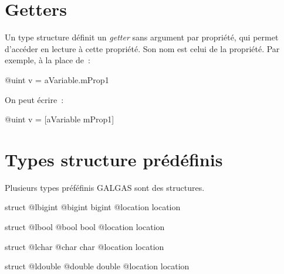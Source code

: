 \section{Getters}

Un type structure définit un \emph{getter} sans argument par propriété, qui permet d'accéder en lecture à cette propriété. Son nom est celui de la propriété. Par exemple, à la place de~:
\begin{galgas}
@uint v = aVariable.mProp1
\end{galgas}

On peut écrire~:
\begin{galgas}
@uint v = [aVariable mProp1]
\end{galgas}



\section{Types structure prédéfinis}

Plusieurs types préféfinis GALGAS sont des structures.
 

\begin{galgas}
struct @lbigint {
  @bigint bigint
  @location location
}
\end{galgas}


 

\begin{galgas}
struct @lbool {
  @bool bool
  @location location
}
\end{galgas}




\begin{galgas}
struct @lchar {
  @char char
  @location location
}
\end{galgas}



\begin{galgas}
struct @ldouble {
  @double double
  @location location
}
\end{galgas}








